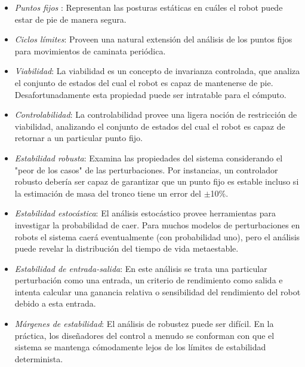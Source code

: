 \begin{itemize}
\item \textit{Puntos fijos} : Representan las posturas estáticas en cuáles el robot puede estar de pie de manera segura.

\item \textit{Ciclos límites}: Proveen una natural extensión del análisis de los puntos fijos para movimientos de caminata periódica.

\item \textit{Viabilidad}: La viabilidad es un concepto de invarianza controlada, que analiza el conjunto de estados del cual el robot es capaz de mantenerse de pie. Desafortunadamente esta propiedad puede ser intratable para el cómputo.

\item \textit{Controlabilidad}: La controlabilidad provee una ligera noción de restricción de viabilidad, analizando el conjunto de estados del cual el robot es capaz de retornar a un particular punto fijo.

\item \textit{Estabilidad robusta}: Examina las propiedades del sistema considerando el "peor de los casos" de las perturbaciones. Por instancias, un controlador robusto debería ser capaz de garantizar que un punto fijo es estable incluso si la estimación de masa del tronco tiene un error del $\pm$10\%.

\item \textit{Estabilidad estocástica}: El análisis estocástico provee herramientas para investigar la probabilidad de caer. Para muchos modelos de perturbaciones en robots el sistema caerá eventualmente (con probabilidad uno), pero el análisis puede revelar la distribución del tiempo de vida metaestable.

\item \textit{Estabilidad de entrada-salida}: En este análisis se trata una particular perturbación como una entrada, un criterio de rendimiento como salida e intenta calcular una ganancia relativa o sensibilidad del rendimiento del robot debido a esta entrada.

\item \textit{Márgenes de estabilidad}: El análisis de robustez puede ser difícil. En la práctica, los diseñadores del control a menudo se conforman con que el sistema se mantenga cómodamente lejos de los límites de estabilidad determinista.		

\end{itemize}

